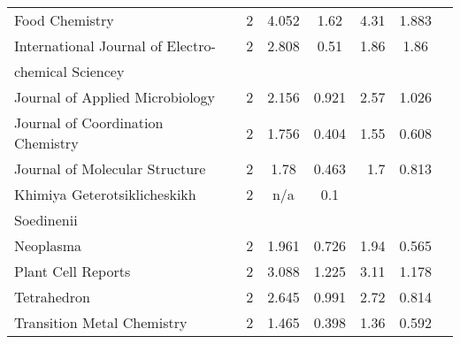 \begin{longtable}[c]{lcccrcc}
 Food Chemistry                                                                     & 2      & 4.052   & 1.62  &  4.31      & 1.883                 \\[0.5ex]
 International Journal of Electro-                                                  & 2      & 2.808   & 0.51  &  1.86      & 1.86                  \\[0.5ex]
 chemical Sciencey                                                                  &        &         &       &            &                       \\[0.5ex]
 Journal of Applied Microbiology                                                    & 2      & 2.156   & 0.921 &  2.57      & 1.026                 \\[0.5ex]
 Journal of Coordination Chemistry                                                  & 2      & 1.756   & 0.404 &  1.55      & 0.608                 \\[0.5ex]
 Journal of Molecular Structure                                                     & 2      & 1.78    & 0.463 &  1.7       & 0.813                 \\[0.5ex]
 Khimiya Geterotsiklicheskikh                                                       & 2      & n/a     & 0.1   &            &                       \\[0.5ex]
 Soedinenii                                                                         &        &         &       &            &                       \\[0.5ex]
 Neoplasma                                                                          & 2      & 1.961   & 0.726 &  1.94      & 0.565                 \\[0.5ex]
 Plant Cell Reports                                                                 & 2      & 3.088   & 1.225 &  3.11      & 1.178                 \\[0.5ex]
 Tetrahedron                                                                        & 2      & 2.645   & 0.991 &  2.72      & 0.814                 \\[0.5ex]
 Transition Metal Chemistry                                                         & 2      & 1.465   & 0.398 &  1.36      & 0.592                 \\[0.5ex]
\end{longtable}





